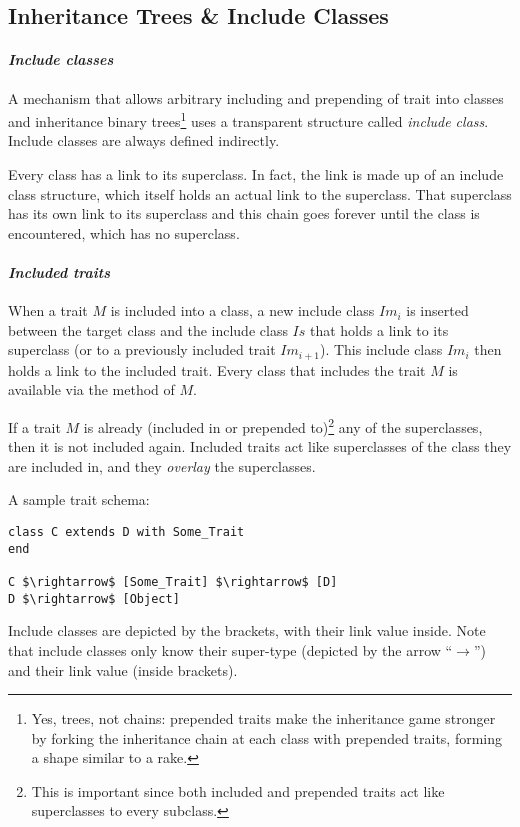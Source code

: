 \subsection{Inheritance Trees \& Include Classes}
\label{sec:inheritance-trees}
\label{sec:include-classes}

\paragraph{\em Include classes}
A mechanism that allows arbitrary including and prepending of trait into classes and inheritance binary trees\footnote{Yes, trees, not chains: prepended traits make the inheritance game stronger by forking the inheritance chain at each class with prepended traits, forming a shape similar to a rake.} uses a transparent structure called {\em include class}. Include classes are always defined indirectly.

Every class has a link to its superclass. In fact, the link is made up of an include class structure, which itself holds an actual link to the superclass. That superclass has its own link to its superclass and this chain goes forever until the  class is encountered, which has no superclass. 

\paragraph{\em Included traits}
When a trait $M$ is included into a class, a new include class $Im_i$ is inserted between the target class and the include class $Is$ that holds a link to its superclass (or to a previously included trait $Im_{i+1}$). This include class $Im_i$ then holds a link to the included trait. Every class that includes the trait $M$ is available via the  method of $M$. 

If a trait $M$ is already (included in or prepended to)\footnote{This is important since both included and prepended traits act like superclasses to every subclass.} any of the superclasses, then it is not included again. Included traits act like superclasses of the class they are included in, and they {\em overlay} the superclasses. 

\example A sample trait schema:
\begin{lstlisting}
class C extends D with Some_Trait
end

C $\rightarrow$ [Some_Trait] $\rightarrow$ [D]
D $\rightarrow$ [Object]
\end{lstlisting}
Include classes are depicted by the brackets, with their link value inside. Note that include classes only know their super-type (depicted by the arrow ``$\rightarrow$'') and their link value (inside brackets). 

